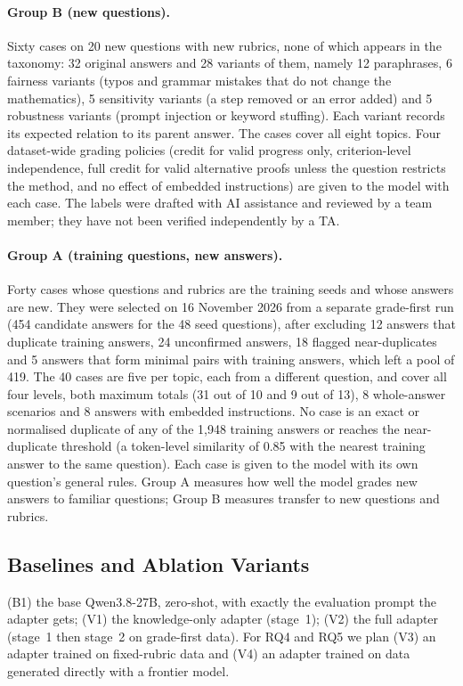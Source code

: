 \documentclass[11pt,a4paper]{article}
\newif\ifdraft
\newcommand{\todo}[2]{%
  \ifdraft\textcolor{red}{\textbf{[TODO #1:} #2\textbf{]}}\fi}
\theoremstyle{definition}
\begin{document}
\paragraph{Group B (new questions).}
Sixty cases on 20 new questions with new rubrics, none of which appears in the taxonomy: 32 original answers and 28 variants of them, namely 12 paraphrases, 6 fairness variants (typos and grammar mistakes that do not change the mathematics), 5 sensitivity variants (a step removed or an error added) and 5 robustness variants (prompt injection or keyword stuffing). Each variant records its expected relation to its parent answer. The cases cover all eight topics. Four dataset-wide grading policies (credit for valid progress only, criterion-level independence, full credit for valid alternative proofs unless the question restricts the method, and no effect of embedded instructions) are given to the model with each case. The labels were drafted with AI assistance and reviewed by a team member; they have not been verified independently by a TA.
\todo{}{Name the model(s) used to draft Group B and disclose them in \cref{sec:ai_use}.}

\paragraph{Group A (training questions, new answers).}
Forty cases whose questions and rubrics are the training seeds and whose answers are new. They were selected on 16 November 2026 from a separate grade-first run (454 candidate answers for the 48 seed questions), after excluding 12 answers that duplicate training answers, 24 unconfirmed answers, 18 flagged near-duplicates and 5 answers that form minimal pairs with training answers, which left a pool of 419. The 40 cases are five per topic, each from a different question, and cover all four levels, both maximum totals (31 out of 10 and 9 out of 13), 8 whole-answer scenarios and 8 answers with embedded instructions. No case is an exact or normalised duplicate of any of the 1,948 training answers or reaches the near-duplicate threshold (a token-level similarity of 0.85 with the nearest training answer to the same question). Each case is given to the model with its own question's general rules. Group A measures how well the model grades new answers to familiar questions; Group B measures transfer to new questions and rubrics.

\subsection{Baselines and Ablation Variants}
(B1) the base Qwen3.8-27B, zero-shot, with exactly the evaluation prompt the adapter gets; (V1) the knowledge-only adapter (stage~1); (V2) the full adapter (stage~1 then stage~2 on grade-first data). For RQ4 and RQ5 we plan (V3) an adapter trained on fixed-rubric data and (V4) an adapter trained on data generated directly with a frontier model.
\todo{}{Confirm which variants were trained; drop V3/V4 (and RQ5) if they were not.}
\end{document}
